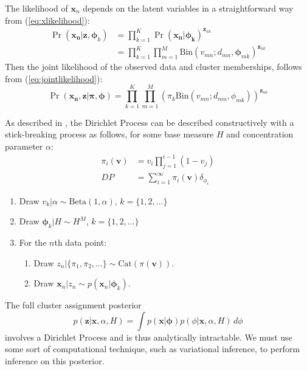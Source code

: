 \documentclass[11pt]{article}
\newcommand{\bx}{\ensuremath{\mathbf{x}}}
\newcommand{\bz}{\ensuremath{\mathbf{z}}}
\newcommand{\bphi}{\ensuremath{\bm{\phi}}}
\begin{document}
The likelihood of $\bx_n$ depends on the latent variables in a straightforward way from (\ref{eq:xlikelihood}):
\begin{align} \label{eq:jointlikelihood}
\Pr(\mathbf{x_n} | \bz, \bphi_k) &= \prod\limits_{k=1}^K \Pr(\mathbf{x_n} | \mathbf{\phi_k})^{\bz_{nk}} \nonumber \\
										&= \prod\limits_{k=1}^K \prod\limits_{m=1}^M \mathrm{Bin}(v_{mn}; d_{mn}, \bphi_{mk})^{\bz_{nk}}
\end{align}
Then the joint likelihood of the observed data and cluster memberships, follows from (\ref{eq:jointlikelihood}): 
\begin{equation}
\Pr(\mathbf{x_n}, \bz | \bm{\pi}, \bphi) = \prod\limits_{k=1}^K \prod\limits_{m=1}^M \left(\pi_k \mathrm{Bin}(v_{mn}; d_{mn}, \phi_{mk})\right)^{\bz_{nk}}
\end{equation}

As described in \cite{Blei2006}, the Dirichlet Process can be described constructively with a stick-breaking process as follows, for some base measure $H$ and concentration parameter $\alpha$:
\begin{align}
\pi_i(\mathbf{v}) &= v_i \prod\limits_{j=1}^{i-1} (1 - v_j) \\
				DP &= \sum_{i=1}^\infty \pi_i(\mathbf{v}) \delta_{\phi_i}
\end{align}
\begin{enumerate}
	\item Draw $v_k | \alpha \sim \mathrm{Beta}(1, \alpha)$, \hspace{0.2cm} $k = \{1, 2, \ldots\}$
	\item Draw $\bphi_k | H \sim H^M$, \hspace{1cm} $k = \{1, 2, \ldots\}$
	\item For the $n$th data point:
	\begin{enumerate}
		\item Draw $z_n | \{\pi_1, \pi_2, \ldots\} \sim \mathrm{Cat}(\pi(\mathbf{v}))$.
		\item Draw $\bx_n | z_n \sim p(\bx_n | \bphi_k)$.
	\end{enumerate}
\end{enumerate}
The full cluster assignment posterior 
\begin{equation}
p(\bz | \bx, \alpha, H) = \int p(\bx | \mathbf{\phi}) p(\phi | \bx, \alpha, H) \, d\phi
\end{equation}
involves a Dirichlet Process and is thus analytically intractable. We must use some sort of computational technique, such as variational inference, to perform inference on this posterior.
\end{document}
